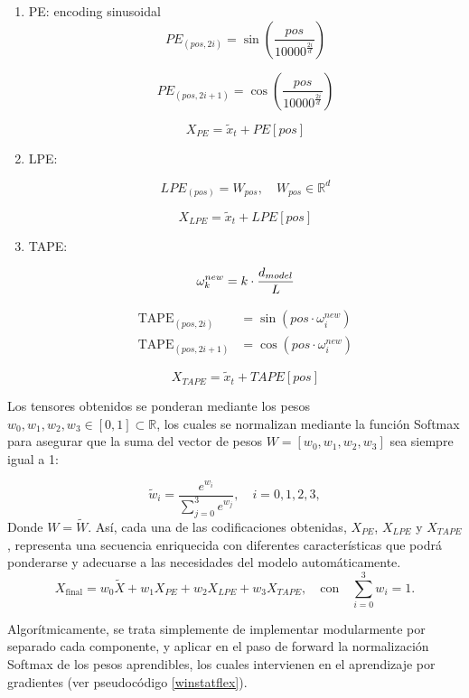 \begin{enumerate}
\item PE: encoding sinusoidal
$$
PE_{(pos, 2i)} = \sin\left(\frac{pos}{10000^{\frac{2i}{d}}}\right)
$$

$$
PE_{(pos, 2i+1)} = \cos\left(\frac{pos}{10000^{\frac{2i}{d}}}\right)
$$

$$
X_{PE} = \tilde{x}_t + PE[pos]
$$
\item LPE:

$$
LPE_{(pos)} = W_{pos}, \quad W_{pos} \in \mathbb{R}^d
$$

$$
X_{LPE} = \tilde{x}_t + LPE[pos]
$$

\item TAPE:

\begin{equation}
	\centering
	\omega^{new}_k = k \cdot \frac{d_{model}}{L}
\end{equation}


\begin{equation}
	\begin{aligned}
		\text{TAPE}_{(pos,2i)} &= \sin\!\left( pos \cdot \omega^{new}_i \right) \\
		\text{TAPE}_{(pos,2i+1)} &= \cos\!\left( pos \cdot \omega^{new}_i \right)
	\end{aligned}
\end{equation}

$$
X_{TAPE} = \tilde{x}_t + TAPE[pos]
$$

\end{enumerate}

Los tensores obtenidos se ponderan mediante los pesos $w_0, w_1, w_2, w_3 \in [0,1] \subset \mathbb{R}$, los cuales se normalizan mediante la función Softmax para asegurar que la suma del vector de pesos $W = [w_0, w_1, w_2, w_3]$ sea siempre igual a 1:

\[
\tilde{w}_i = \frac{e^{w_i}}{\sum_{j=0}^3 e^{w_j}}, \quad i = 0,1,2,3,
\]
Donde $W = \tilde{W}$.
 Así, cada una de las codificaciones obtenidas, \(X_{PE}\), \(X_{LPE}\) y \(X_{TAPE}\), representa una secuencia enriquecida con diferentes características que podrá ponderarse y adecuarse a las necesidades del modelo automáticamente. 
\[
X_{\text{final}} = w_0 \tilde{X} + w_1 X_{PE} + w_2 X_{LPE} + w_3 X_{TAPE}, \quad \text{con} \quad \sum_{i=0}^3 w_i = 1.
\]

Algorítmicamente, se trata simplemente de implementar modularmente por separado cada componente, y aplicar en el paso de forward la normalización Softmax de los pesos aprendibles, los cuales intervienen en el aprendizaje por gradientes (ver pseudocódigo \ref{winstatflex}).

